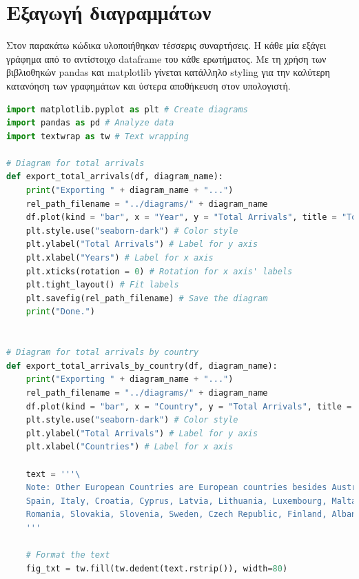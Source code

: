 \documentclass[a4paper]{article}
\begin{document}
\section{Εξαγωγή διαγραμμάτων}
Στον παρακάτω κώδικα υλοποιήθηκαν τέσσερις συναρτήσεις. Η κάθε μία εξάγει γράφημα από το αντίστοιχο \textlatin{dataframe} του κάθε ερωτήματος. Με τη χρήση των βιβλιοθηκών \textlatin{pandas} και \textlatin{matplotlib} γίνεται κατάλληλο \textlatin{styling} για την καλύτερη κατανόηση των γραφημάτων και ύστερα αποθήκευση στον υπολογιστή.


\begin{lstlisting}[language=Python, caption=diagram.py]
import matplotlib.pyplot as plt # Create diagrams
import pandas as pd # Analyze data
import textwrap as tw # Text wrapping

# Diagram for total arrivals
def export_total_arrivals(df, diagram_name):
    print("Exporting " + diagram_name + "...")
    rel_path_filename = "../diagrams/" + diagram_name
    df.plot(kind = "bar", x = "Year", y = "Total Arrivals", title = "Total Arrivals in 2011-2014", legend = False) # Plotting the dataframe
    plt.style.use("seaborn-dark") # Color style
    plt.ylabel("Total Arrivals") # Label for y axis
    plt.xlabel("Years") # Label for x axis
    plt.xticks(rotation = 0) # Rotation for x axis' labels
    plt.tight_layout() # Fit labels
    plt.savefig(rel_path_filename) # Save the diagram
    print("Done.")


# Diagram for total arrivals by country
def export_total_arrivals_by_country(df, diagram_name):
    print("Exporting " + diagram_name + "...")
    rel_path_filename = "../diagrams/" + diagram_name
    df.plot(kind = "bar", x = "Country", y = "Total Arrivals", title = "Total Arrivals by Country in 2011-2014", legend = False) # Plotting the dataframe
    plt.style.use("seaborn-dark") # Color style
    plt.ylabel("Total Arrivals") # Label for y axis
    plt.xlabel("Countries") # Label for x axis

    text = '''\
    Note: Other European Countries are European countries besides Austria, Belgium, Bulgaria, Denmark, Estonia, Ireland, 
    Spain, Italy, Croatia, Cyprus, Latvia, Lithuania, Luxembourg, Malta, Netherlands, Hungary, Poland, Portugal, 
    Romania, Slovakia, Slovenia, Sweden, Czech Republic, Finland, Albania, Switzerland, Norway, Iceland, Russia, Servia.
    '''

    # Format the text
    fig_txt = tw.fill(tw.dedent(text.rstrip()), width=80)


\end{lstlisting}
\end{document}
